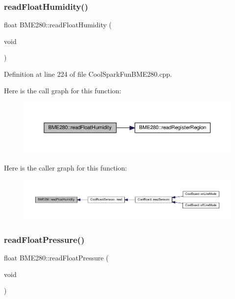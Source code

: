 \subsubsection{\texorpdfstring{read\+Float\+Humidity()}{readFloatHumidity()}}
{\footnotesize\ttfamily float B\+M\+E280\+::read\+Float\+Humidity (\begin{DoxyParamCaption}\item[{void}]{ }\end{DoxyParamCaption})}



Definition at line 224 of file Cool\+Spark\+Fun\+B\+M\+E280.\+cpp.

Here is the call graph for this function\+:\nopagebreak
\begin{figure}[H]
\begin{center}
\leavevmode
\includegraphics[width=350pt]{class_b_m_e280_a42ea7232039eebf5aadb391ef6132c35_cgraph}
\end{center}
\end{figure}
Here is the caller graph for this function\+:\nopagebreak
\begin{figure}[H]
\begin{center}
\leavevmode
\includegraphics[width=350pt]{class_b_m_e280_a42ea7232039eebf5aadb391ef6132c35_icgraph}
\end{center}
\end{figure}
\mbox{\label{class_b_m_e280_ada6e799917afb4f228e6253bc56ffe75}} 
\subsubsection{\texorpdfstring{read\+Float\+Pressure()}{readFloatPressure()}}
{\footnotesize\ttfamily float B\+M\+E280\+::read\+Float\+Pressure (\begin{DoxyParamCaption}\item[{void}]{ }\end{DoxyParamCaption})}



